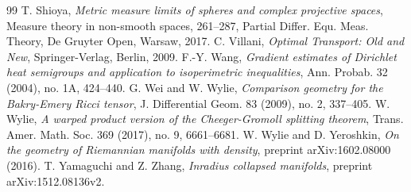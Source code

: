 \documentclass[12pt]{amsart}
\theoremstyle{plain}
\theoremstyle{definition}
\theoremstyle{remark}
\begin{document}
\begin{thebibliography}{99}
  T. Shioya, \textit{Metric measure limits of spheres and complex projective spaces}, Measure theory in non-smooth spaces, 261--287, Partial Differ. Equ. Meas. Theory, De Gruyter Open, Warsaw, 2017.
    C. Villani, \textit{Optimal Transport: Old and New}, Springer-Verlag, Berlin, 2009.
 F.-Y. Wang, \textit{Gradient estimates of Dirichlet heat semigroups and application to isoperimetric inequalities}, Ann. Probab. 32 (2004), no. 1A, 424--440.
 G. Wei and W. Wylie, \textit{Comparison geometry for the Bakry-Emery Ricci tensor}, J. Differential Geom. 83 (2009), no. 2, 337--405.
      W. Wylie, \textit{A warped product version of the Cheeger-Gromoll splitting theorem}, Trans. Amer. Math. Soc. 369 (2017), no. 9, 6661--6681.
    W. Wylie and D. Yeroshkin, \textit{On the geometry of Riemannian manifolds with density}, preprint arXiv:1602.08000 (2016).
  T. Yamaguchi and Z. Zhang, \textit{Inradius collapsed manifolds}, preprint arXiv:1512.08136v2.
\end{thebibliography}
\end{document}
